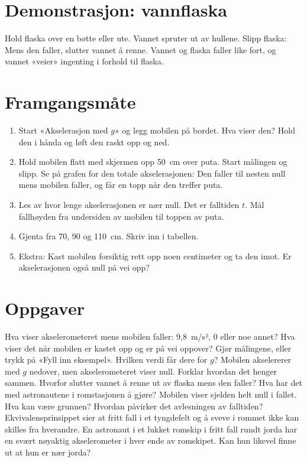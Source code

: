 \documentclass[11pt]{article}
\begin{document}
\section*{Demonstrasjon: vannflaska}

Hold flaska over en bøtte eller ute. Vannet spruter ut av hullene. Slipp flaska: Mens den faller, slutter vannet å renne. Vannet og flaska faller like fort, og vannet «veier» ingenting i forhold til flaska.

\section*{Framgangsmåte}

\begin{enumerate}
\item Start «Akselerasjon med $g$» og legg mobilen på bordet. Hva viser den? Hold den i hånda og løft den raskt opp og ned.
\item Hold mobilen flatt med skjermen opp 50~cm over puta. Start målingen og slipp. Se på grafen for den totale akselerasjonen: Den faller til nesten null mens mobilen faller, og får en topp når den treffer puta.
\item Les av hvor lenge akselerasjonen er nær null. Det er falltiden $t$. Mål fallhøyden fra undersiden av mobilen til toppen av puta.
\item Gjenta fra 70, 90 og 110~cm. Skriv inn i tabellen.
\item Ekstra: Kast mobilen forsiktig rett opp noen centimeter og ta den imot. Er akselerasjonen også null på vei opp?
\end{enumerate}

\section*{Oppgaver}

\begin{oppgaveliste}
\oppgave {}Hva viser akselerometeret mens mobilen faller: 9,8~m/s², 0 eller noe annet? Hva viser det når mobilen er kastet opp og er på vei oppover?
\svar
\oppgave {}Gjør målingene, eller trykk på «Fyll inn eksempel». Hvilken verdi får dere for $g$?
\svar
\oppgave {}Mobilen akselererer med $g$ nedover, men akselerometeret viser null. Forklar hvordan det henger sammen.
\svar
\oppgave {}Hvorfor slutter vannet å renne ut av flaska mens den faller? Hva har det med astronautene i romstasjonen å gjøre?
\svar
\oppgave {}Mobilen viser sjelden helt null i fallet. Hva kan være grunnen? Hvordan påvirker det avlesningen av falltiden?
\svar
\oppgave {}Ekvivalensprinsippet sier at fritt fall i et tyngdefelt og å sveve i rommet ikke kan skilles fra hverandre. En astronaut i et lukket romskip i fritt fall rundt jorda har en svært nøyaktig akselerometer i hver ende av romskipet. Kan hun likevel finne ut at hun er nær jorda?
\svar
\end{oppgaveliste}
\end{document}
